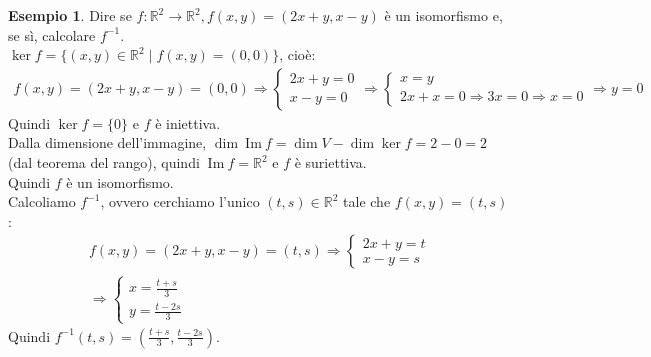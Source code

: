 \documentclass[a4paper]{article}
\newcommand{\IM}{\ \mathrm{Im} \ }
\theoremstyle{definition}
\newtheorem*{es}{Esempio}
\begin{document}
\begin{es}
	Dire se $f: \mathbb{R}^2 \rightarrow \mathbb{R}^2, f(x, y) = (2x + y, x- y)$ è un isomorfismo e, se sì, calcolare $f^{-1}$. \\
	$\ker f = \{(x, y) \in \mathbb{R}^2 \mid f(x, y) = (0, 0)\}$, cioè:
	\begin{align*}
		f(x, y) = (2x + y, x - y) = (0, 0) \Rightarrow \begin{cases}
			                                                2x + y = 0 \\
			                                                x - y = 0
		                                                \end{cases}
		\Rightarrow \begin{cases}
			            x = y \\
			            2x + x = 0 \Rightarrow 3x = 0 \Rightarrow x = 0
		            \end{cases} \Rightarrow y = 0
	\end{align*}
	Quindi $\ker f = \{0\}$ e $f$ è iniettiva. \\
	Dalla dimensione dell'immagine, $\dim \IM f = \dim V - \dim \ker f = 2 - 0 = 2$ (dal teorema del rango), quindi $\IM f = \mathbb{R}^2$ e $f$ è suriettiva. \\
	Quindi $f$ è un isomorfismo. \\
	Calcoliamo $f^{-1}$, ovvero cerchiamo l'unico $(t, s) \in \mathbb{R}^2$ tale che $f(x, y) = (t, s)$:
	\begin{align*}
		f(x, y) = (2x + y, x - y) = (t, s) \Rightarrow \begin{cases}
			                                                2x + y = t \\
			                                                x - y = s
		                                                \end{cases} \\
		\Rightarrow \begin{cases}
			            x = \frac{t + s}{3} \\
						y = \frac{t - 2s}{3}
		            \end{cases}
	\end{align*}
	Quindi $f^{-1}(t, s) = \left( \frac{t + s}{3}, \frac{t - 2s}{3} \right)$.
\end{es}
\end{document}
